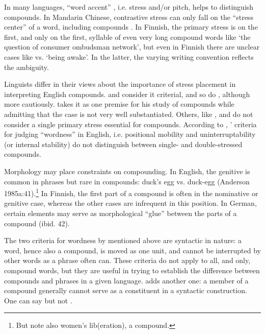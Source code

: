 In many languages, ``word accent'' \citep[204]{Lyons1968}, i.e. stress and/or pitch, helps to distinguish compounds. In Mandarin Chinese, contrastive stress can only fall on the ``stress center'' of a word, including compounds \citep[41]{Anderson1985a}. In Finnish, the primary stress is on the first, and only on the first, syllable of even very long compound words like  `the question of consumer ombudsman network', but even in Finnish there are unclear cases like  vs. \textstyleEmphasizedWords{} `being awake'. In the latter, the varying writing convention reflects the ambiguity. 

Linguists differ in their views about the importance of stress placement in interpreting English compounds. \citet[228]{Bloomfield1935} and \citet[41]{Anderson1985a} consider it criterial, and so do \citet[1330]{QuirkEtAl1989}, although more cautiously. \citet[120]{Lees1968} takes it as one premise for his study of compounds while admitting that the case is not very well substantiated. Others, like \citet[31]{Jespersen1933}, \citet{Downing1977} and \citet{Bauer1983} do not consider a single primary stress essential for compounds. According to \citet[105]{Bauer1983}, \citeauthor{Lyons1968}' \citeyear[20]{Lyons1968} criteria for judging ``wordness'' in English, i.e. positional mobility and uninterruptability (or internal stability) do not distinguish between single- and double-stressed compounds.

Morphology may place constraints on compounding. In English, the genitive is common in phrases but rare in compounds: duck's egg vs. duck-egg (Anderson{ 1985a}:41).\footnote{But note also women's lib(eration), a compound.} In Finnish, the first part of a compound is often in the nominative or genitive case, whereas the other cases are infrequent in this position. In German, certain elements may serve as morphological ``glue'' between the parts of a compound (ibid. 42).

The two criteria for wordness by \citet[202]{Lyons1968} mentioned above are syntactic in nature: a word, hence also a compound, is moved as one unit, and cannot be interrupted by other words as a phrase often can. These criteria do not apply to all, and only, compound words, but they are useful in trying to establish the difference between compounds and phrases in a given language. \citet[232]{Bloomfield1933} adds another one: a member of a compound generally cannot serve as a constituent in a syntactic construction. One can say  but not .

